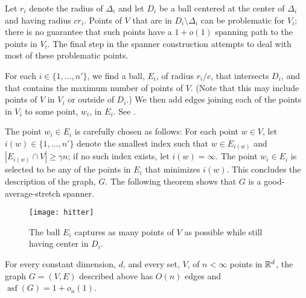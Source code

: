 \documentclass{patmorin}
\DeclareMathOperator{\asf}{asf}
\begin{document}
Let $r_i$ denote the radius of $\Delta_i$ and let $D_i$ be a ball centered
at the center of $\Delta_i$ and having radius $cr_i$.  Points of $V$
that are in $D_i\setminus \Delta_i$ can be problematic for $V_i$; there
is no guarantee that such points have a $1+o(1)$ spanning path to the
points in $V_i$.  The final step in the spanner construction attempts
to deal with most of these problematic points.

For each $i\in\{1,\ldots,n'\}$, we find a ball, $E_i$, of radius $r_i/c$,
that intersects $D_i$, and that contains the maximum number of points
of $V$.  (Note that this may include points of $V$ in $V_i$ or outside
of $D_i$.)  We then add edges joining each of the points in $V_i$ to
some point, $w_i$, in $E_i$.  See .

The point $w_i\in E_i$ is carefully chosen as follows: For each point
$w\in V$, let $i(w)\in \{1,\ldots,n'\}$ denote the smallest index such
that $w\in E_{i(w)}$ and $|E_{i(w)}\cap V| \ge \gamma n$; if no such
index exists, let $i(w)=\infty$.  The point $w_i\in E_i$ is selected
to be any of the points in $E_i$ that minimizes $i(w)$.  This concludes
the description of the graph, $G$.  The following theorem shows that $G$
is a good-average-stretch spanner.

\begin{figure}
  \begin{center}
    \texttt{[image: hitter]}
  \end{center}
  \caption{The ball $E_i$ captures as many points of $V$ as possible
   while still having center in $D_i$.}
\end{figure}

\begin{thm}
  For every constant dimension, $d$, and every set, $V$, of
  $n<\infty$ points in $\mathbb{R}^d$, the graph $G=(V,E)$ described above
  has $O(n)$ edges and $\asf(G)=1+o_n(1)$.
\end{thm}
\end{document}
